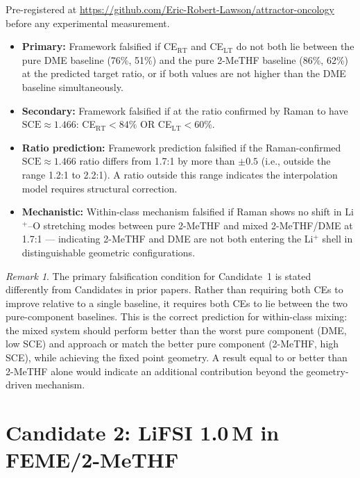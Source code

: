 \documentclass[11pt]{article}
\theoremstyle{plain}
\theoremstyle{definition}
\theoremstyle{remark}
\newtheorem{remark}{Remark}[section]
\begin{document}
Pre-registered at
\url{https://github.com/Eric-Robert-Lawson/attractor-oncology}
before any experimental measurement.

\begin{itemize}[leftmargin=2em]
  \item \textbf{Primary:} Framework falsified if CE$_\mathrm{RT}$
        and CE$_\mathrm{LT}$ do not both lie between the pure DME
        baseline (76\%, 51\%) and the pure 2-MeTHF baseline (86\%,
        62\%) at the predicted target ratio, or if both values are not
        higher than the DME baseline simultaneously.
  \item \textbf{Secondary:} Framework falsified if at the ratio
        confirmed by Raman to have $\mathrm{SCE} \approx 1.466$:
        CE$_\mathrm{RT} < 84\%$ OR CE$_\mathrm{LT} < 60\%$.
  \item \textbf{Ratio prediction:} Framework prediction falsified if
        the Raman-confirmed $\mathrm{SCE} \approx 1.466$ ratio differs
        from 1.7:1 by more than $\pm 0.5$ (i.e., outside the range
        1.2:1 to 2.2:1).  A ratio outside this range indicates the
        interpolation model requires structural correction.
  \item \textbf{Mechanistic:} Within-class mechanism falsified if
        Raman shows no shift in Li$^+$--O stretching modes between
        pure 2-MeTHF and mixed 2-MeTHF/DME at 1.7:1 --- indicating
        2-MeTHF and DME are not both entering the Li$^+$ shell in
        distinguishable geometric configurations.
\end{itemize}

\begin{remark}
The primary falsification condition for Candidate~1 is stated
differently from Candidates in prior papers.  Rather than requiring
both CEs to improve relative to a single baseline, it requires both
CEs to lie between the two pure-component baselines.  This is the
correct prediction for within-class mixing: the mixed system should
perform better than the worst pure component (DME, low SCE) and
approach or match the better pure component (2-MeTHF, high SCE),
while achieving the fixed point geometry.  A result equal to or
better than 2-MeTHF alone would indicate an additional contribution
beyond the geometry-driven mechanism.
\end{remark}

\section{Candidate 2: LiFSI 1.0\,M in FEME/2-MeTHF}
\label{sec:candidate2}
\end{document}
